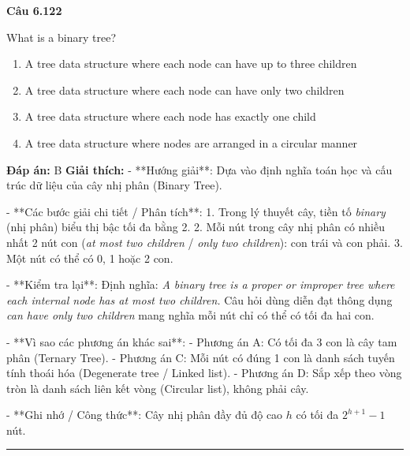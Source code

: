 \documentclass[11pt,a4paper]{article}
\newenvironment{question}[1]{%
  \par\vspace{1em}\noindent\textbf{\large Câu #1}\par\vspace{0.4em}
}{%
  \par\vspace{1em}\hrule\vspace{0.6em}
}
\newenvironment{choices}{%
  \begin{enumerate}[label=\textbf{\Alph*.},leftmargin=2.2em,itemsep=2pt,topsep=3pt]
}{%
  \end{enumerate}
}
\newcommand{\choice}{\item}
\begin{document}
\begin{question}{6.122}
What is a binary tree?
\begin{choices}
\choice A tree data structure where each node can have up to three children
\choice A tree data structure where each node can have only two children
\choice A tree data structure where each node has exactly one child
\choice A tree data structure where nodes are arranged in a circular manner
\end{choices}
\textbf{Đáp án:} B
\textbf{Giải thích:} - **Hướng giải**:
Dựa vào định nghĩa toán học và cấu trúc dữ liệu của cây nhị phân (Binary Tree).


- **Các bước giải chi tiết / Phân tích**:
1. Trong lý thuyết cây, tiền tố \textit{binary} (nhị phân) biểu thị bậc tối đa bằng 2.
2. Mỗi nút trong cây nhị phân có nhiều nhất 2 nút con (\textit{at most two children} / \textit{only two children}): con trái và con phải.
3. Một nút có thể có 0, 1 hoặc 2 con.


- **Kiểm tra lại**:
Định nghĩa: \textit{A binary tree is a proper or improper tree where each internal node has at most two children.} Câu hỏi dùng diễn đạt thông dụng \textit{can have only two children} mang nghĩa mỗi nút chỉ có thể có tối đa hai con.


- **Vì sao các phương án khác sai**:
- Phương án A: Có tối đa 3 con là cây tam phân (Ternary Tree).
- Phương án C: Mỗi nút có đúng 1 con là danh sách tuyến tính thoái hóa (Degenerate tree / Linked list).
- Phương án D: Sắp xếp theo vòng tròn là danh sách liên kết vòng (Circular list), không phải cây.


- **Ghi nhớ / Công thức**:
Cây nhị phân đầy đủ độ cao \(h\) có tối đa \(2^{h+1}-1\) nút.
\end{question}
\end{document}

